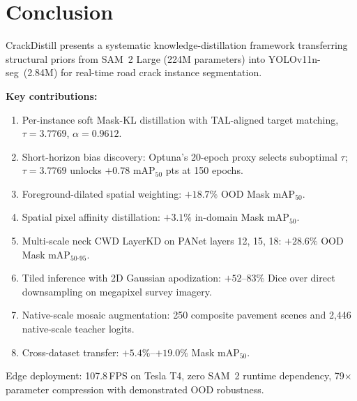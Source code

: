 \documentclass[12pt,a4paper]{article}
\newcommand{\yolo}{YOLOv11n-seg}
\begin{document}
\section{Conclusion}
\label{sec:conclusion}

CrackDistill presents a systematic knowledge-distillation framework transferring
structural priors from SAM~2 Large (224M parameters) into \yolo\ (2.84M)
for real-time road crack instance segmentation.

\noindent\textbf{Key contributions:}
\begin{enumerate}
  \item Per-instance soft Mask-KL distillation with TAL-aligned target matching,
    $\tau=3.7769$, $\alpha=0.9612$.
  \item Short-horizon bias discovery: Optuna's 20-epoch proxy selects suboptimal
    $\tau$; $\tau=3.7769$ unlocks $+0.78$ mAP$_{50}$ pts at 150 epochs.
  \item Foreground-dilated spatial weighting: $+18.7\%$ OOD Mask mAP$_{50}$.
  \item Spatial pixel affinity distillation: $+3.1\%$ in-domain Mask mAP$_{50}$.
  \item Multi-scale neck CWD LayerKD on PANet layers 12, 15, 18:
    $+28.6\%$ OOD Mask mAP$_{50\text{-}95}$.
  \item Tiled inference with 2D Gaussian apodization: $+52$--$83\%$ Dice over
    direct downsampling on megapixel survey imagery.
  \item Native-scale mosaic augmentation: 250 composite pavement scenes and
    2,446 native-scale teacher logits.
  \item Cross-dataset transfer: $+5.4\%$--$+19.0\%$ Mask mAP$_{50}$.
\end{enumerate}

Edge deployment: 107.8\,FPS on Tesla T4, zero SAM~2 runtime dependency,
79$\times$ parameter compression with demonstrated OOD robustness.
\end{document}
